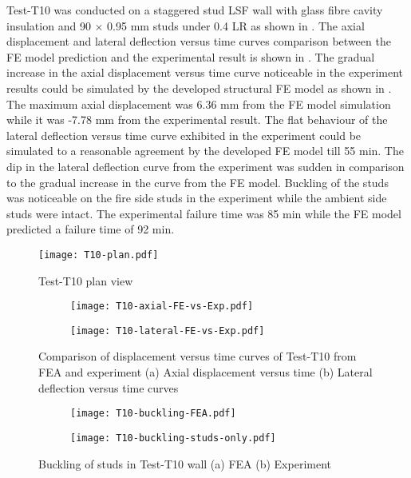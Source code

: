 Test-T10 was conducted on a staggered stud LSF wall with glass fibre cavity insulation and 90 $\times$ 0.95 mm studs under 0.4 LR as shown in . The axial displacement and lateral deflection versus time curves comparison between the FE model prediction and the experimental result is shown in . The gradual increase in the axial displacement versus time curve noticeable in the experiment results could be simulated by the developed structural FE model as shown in . The maximum axial displacement was 6.36 mm from the FE model simulation while it was -7.78 mm from the experimental result. The flat behaviour of the lateral deflection versus time curve exhibited in the experiment could be simulated to a reasonable agreement by the developed FE model till 55 min. The dip in the lateral deflection curve from the experiment was sudden in comparison to the gradual increase in the curve from the FE model. Buckling of the studs was noticeable on the fire side studs in the experiment while the ambient side studs were intact. The experimental failure time was 85 min while the FE model predicted a failure time of 92 min.
\begin{figure}[!htbp]
	\centering
			\texttt{[image: T10-plan.pdf]}\\
		\caption{Test-T10 plan view}
		\label{fig:T10-plan-FEA}
\end{figure}
\begin{figure}[!htbp]
	\centering
	\begin{subfigure}[b]{0.7\textwidth}
		\centering
		\texttt{[image: T10-axial-FE-vs-Exp.pdf]}
		\caption{}
		\label{subfig:T10-axial-FE-vs-Exp}
	\end{subfigure}
	\begin{subfigure}[b]{0.7\textwidth}
		\centering
		\texttt{[image: T10-lateral-FE-vs-Exp.pdf]}
		\caption{}
		\label{subfig:T10-lateral-FE-vs-Exp}
	\end{subfigure}
	   \caption{Comparison of displacement versus time curves of Test-T10 from FEA and experiment (a) Axial displacement versus time (b) Lateral deflection versus time curves}
	   \label{fig:T10-structural-FE-vs-Exp}
\end{figure}
\begin{figure}[!htbp]
	\centering
	\begin{subfigure}[b]{0.8\textwidth}
		\centering
		\texttt{[image: T10-buckling-FEA.pdf]}
		\caption{}
		\label{subfig:T10-buckling-FEA}
	\end{subfigure}
	\begin{subfigure}[b]{0.5\textwidth}
		\centering
		\texttt{[image: T10-buckling-studs-only.pdf]}
		\caption{}
		\label{subfig:T10-buckling-FEA-Exp}
	\end{subfigure}
	   \caption{Buckling of studs in Test-T10 wall (a) FEA (b) Experiment}
	   \label{fig:T10-buckling-FE-vs-Exp}
\end{figure} 

